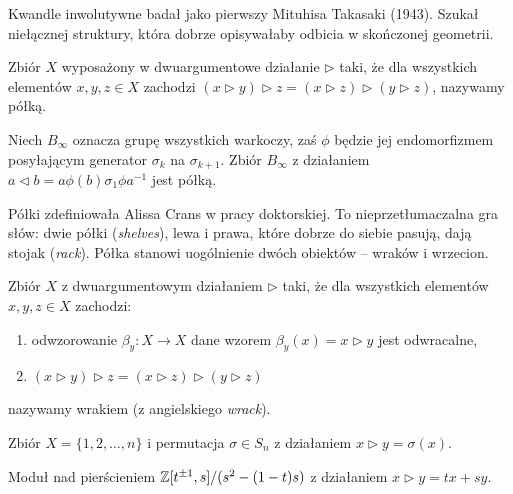 Kwandle inwolutywne badał jako pierwszy Mituhisa Takasaki (1943).
Szukał niełącznej struktury, która dobrze opisywałaby odbicia w skończonej geometrii.

\begin{definition}[półka]
    Zbiór $X$ wyposażony w dwuargumentowe działanie $\triangleright$ taki, że dla wszystkich elementów $x, y, z \in X$ zachodzi $(x \triangleright y) \triangleright z = (x \triangleright z) \triangleright (y \triangleright z)$, nazywamy półką.
\end{definition}

\begin{example}
    Niech $B_\infty$ oznacza grupę wszystkich warkoczy, zaś $\phi$ będzie jej endomorfizmem posyłającym generator $\sigma_k$ na $\sigma_{k+1}$.
    Zbiór $B_\infty$ z działaniem $a \triangleleft b = a\phi(b)\sigma_1 \phi{a} ^{-1}$ jest półką.
\end{example}

Półki zdefiniowała Alissa Crans w pracy doktorskiej.
To nieprzetłumaczalna gra słów: dwie półki (\emph{shelves}), lewa i prawa, które dobrze do siebie pasują, dają stojak (\emph{rack}).
Półka stanowi uogólnienie dwóch obiektów -- wraków i wrzecion.

\begin{definition}[wrak]
    Zbiór $X$ z dwuargumentowym działaniem $\triangleright$ taki, że dla wszystkich elementów $x, y, z \in X$ zachodzi:
    \begin{enumerate}
        \item odwzorowanie $\beta_y \colon X \to X$ dane wzorem $\beta_y(x) = x \triangleright y$ jest odwracalne,
        \item $(x \triangleright y) \triangleright z = (x \triangleright z) \triangleright (y \triangleright z)$
    \end{enumerate}
    nazywamy wrakiem (z angielskiego \emph{wrack}).
\end{definition}

\begin{example}
    Zbiór $X = \{1, 2, \ldots, n\}$ i permutacja $\sigma \in S_n$ z działaniem $x \triangleright y = \sigma(x)$.
\end{example}

\begin{example}
    Moduł nad pierścieniem $\mathbb Z[t^{\pm 1}, s]/(s^2 - (1-t)s)$ z działaniem $x \triangleright y = tx+sy$.
\end{example}

